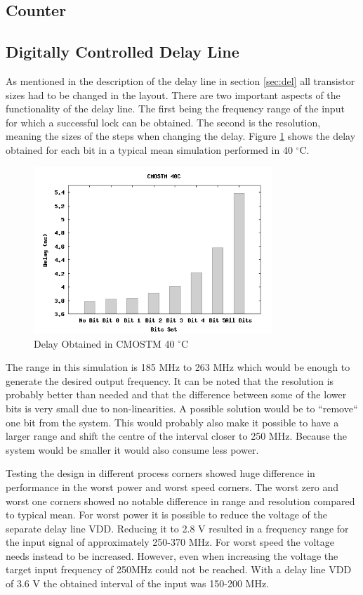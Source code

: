 \documentclass[a4paper,12pt]{article} \usepackage{graphicx}
\newcommand{\degree}{\ensuremath{^\circ}}
\begin{document}
\subsection{Counter}

\subsection{Digitally Controlled Delay Line}
As mentioned in the description of the delay line in section \ref{sec:del} all
transistor sizes had to be changed in the layout. There are two important aspects of
the functionality of the delay line. The first being the frequency range of the input
for which a successful lock can be obtained. The second is the resolution,
meaning the sizes of the steps when changing the delay. Figure \ref{fig:del_bit}
shows the delay obtained for each bit in a typical mean simulation performed in
40 \degree C.

\begin{figure}[h]
    \centering
    \includegraphics[width=0.8\textwidth]{../Bilder/Layout/simulations/delayCMOSTM40.png}
    \caption{Delay Obtained in CMOSTM 40 \degree C}
    \label{fig:del_bit}
\end{figure}

The range in this simulation is 185 MHz to 263 MHz which would be enough to
generate the desired output frequency. It can be noted that the resolution is
probably better than needed and that the difference between some of the lower
bits is very small due to non-linearities. A possible solution would be to
``remove`` one bit from the system. This would probably also make it possible to
have a larger range and shift the centre of the interval closer to 250 MHz.
Because the system would be smaller it would also consume less power.

Testing the design in different process corners showed huge difference in
performance in the worst power and worst speed corners. The worst zero and worst
one corners showed no notable difference in range and resolution compared to typical
mean. For worst power it is possible to reduce the voltage of the separate delay
line VDD. Reducing it to 2.8 V resulted in a frequency range for the input signal
of approximately 250-370 MHz. For worst speed the voltage needs instead to be
increased. However, even when increasing the voltage the target input frequency
of 250MHz could not be reached. With a delay line VDD of 3.6 V the obtained
interval of the input was 150-200 MHz.   
\end{document}
